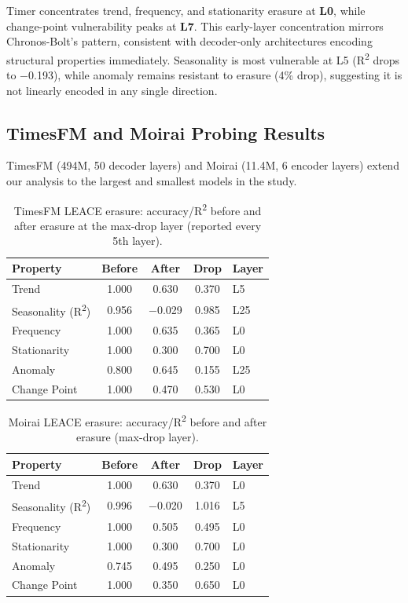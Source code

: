 \documentclass{article}
\begin{document}
Timer concentrates trend, frequency, and stationarity erasure at \textbf{L0}, while change-point
vulnerability peaks at \textbf{L7}. This early-layer concentration mirrors Chronos-Bolt's
pattern, consistent with decoder-only architectures encoding structural properties immediately.
Seasonality is most vulnerable at L5 (R\textsuperscript{2} drops to $-$0.193), while anomaly
remains resistant to erasure (4\% drop), suggesting it is not linearly encoded in any single
direction.

\subsection{TimesFM and Moirai Probing Results}

TimesFM (494M, 50 decoder layers) and Moirai (11.4M, 6 encoder layers) extend our analysis to the largest and smallest models in the study.

\begin{table}[tbp]
\caption{TimesFM LEACE erasure: accuracy/R\textsuperscript{2} before and after erasure at the
max-drop layer (reported every 5th layer).}
\label{tab:timesfm_leace}
\centering
\small
\begin{tabular}{lcccl}
\toprule
Property & Before & After & Drop & Layer \\
\midrule
Trend & 1.000 & 0.630 & 0.370 & L5 \\
Seasonality (R\textsuperscript{2}) & 0.956 & $-$0.029 & 0.985 & L25 \\
Frequency & 1.000 & 0.635 & 0.365 & L0 \\
Stationarity & 1.000 & 0.300 & 0.700 & L0 \\
Anomaly & 0.800 & 0.645 & 0.155 & L25 \\
Change Point & 1.000 & 0.470 & 0.530 & L0 \\
\bottomrule
\end{tabular}
\end{table}

\begin{table}[tbp]
\caption{Moirai LEACE erasure: accuracy/R\textsuperscript{2} before and after erasure (max-drop layer).}
\label{tab:moirai_leace}
\centering
\small
\begin{tabular}{lcccl}
\toprule
Property & Before & After & Drop & Layer \\
\midrule
Trend & 1.000 & 0.630 & 0.370 & L0 \\
Seasonality (R\textsuperscript{2}) & 0.996 & $-$0.020 & 1.016 & L5 \\
Frequency & 1.000 & 0.505 & 0.495 & L0 \\
Stationarity & 1.000 & 0.300 & 0.700 & L0 \\
Anomaly & 0.745 & 0.495 & 0.250 & L0 \\
Change Point & 1.000 & 0.350 & 0.650 & L0 \\
\bottomrule
\end{tabular}
\end{table}
\end{document}

